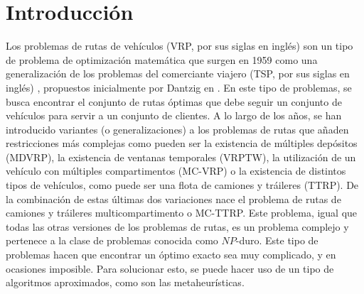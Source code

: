 \documentclass[11pt,a4paper]{book}
\theoremstyle{definition}
\theoremstyle{remark}
\begin{document}



\clearpage

\thispagestyle{empty}


\chapter*{Introducci\'on}


Los problemas de rutas de vehículos (VRP, por sus siglas en inglés) son un tipo de problema de optimización matemática que surgen en 1959 como una generalización de los problemas del comerciante viajero (TSP, por sus siglas en inglés) \cite{tsp-dantzig}, propuestos inicialmente por Dantzig en \cite{vrp-og}. En este tipo de problemas, se busca encontrar el conjunto de rutas óptimas que debe seguir un conjunto de vehículos para servir a un conjunto de clientes. A lo largo de los años, se han introducido variantes (o generalizaciones) a los problemas de rutas que añaden restricciones más complejas como pueden ser la existencia de múltiples depósitos (MDVRP), la existencia de ventanas temporales (VRPTW), la utilización de un vehículo con múltiples compartimentos (MC-VRP) o la existencia de distintos tipos de vehículos, como puede ser una flota de camiones y tráileres (TTRP). De la combinación de estas últimas dos variaciones nace el problema de rutas de camiones y tráileres multicompartimento o MC-TTRP. Este problema, igual que todas las otras versiones de los problemas de rutas, es un problema complejo y pertenece a la clase de problemas conocida como $NP$-duro. Este tipo de problemas hacen que encontrar un óptimo exacto sea muy complicado, y en ocasiones imposible. Para solucionar esto, se puede hacer uso de un tipo de algoritmos aproximados, como son las metaheurísticas.\\
\end{document}
